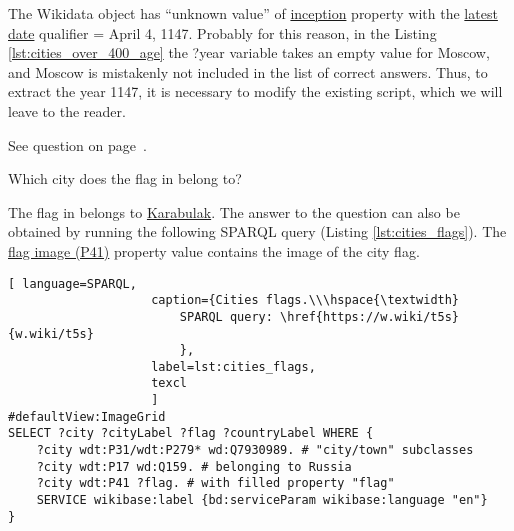 

The Wikidata object  has ``unknown value'' of \href{https://www.wikidata.org/wiki/Property:P571}{inception} property with the \href{https://www.wikidata.org/wiki/Property:P1326}{latest date} qualifier = April 4, 1147. Probably for this reason, in the Listing \ref{lst:cities_over_400_age} the ?year variable takes an empty value for Moscow, and Moscow is mistakenly not included in the list of correct answers. Thus, to extract the year 1147, it is necessary to modify the existing script, which we will leave to the reader.


See question on page~\pageref{question:cities_over_400_age}.

\begin{exercise}%
    \label{answer:cities_flags}
Which city does the flag in  belong to?
\end{exercise}

The flag in  belongs to \href{https://w.wiki/qqN}{Karabulak}. The answer to the question can also be obtained by running the following SPARQL query (Listing \ref{lst:cities_flags}). The \href{https://www.wikidata.org/wiki/Property:P41}{flag image (P41)} property value contains the image of the city flag.

\begin{lstlisting}[ language=SPARQL, 
                    caption={Cities flags.\\\hspace{\textwidth}
                        SPARQL query: \href{https://w.wiki/t5s}{w.wiki/t5s}
                        },
                    label=lst:cities_flags,
                    texcl 
                    ]
#defaultView:ImageGrid
SELECT ?city ?cityLabel ?flag ?countryLabel WHERE {
	?city wdt:P31/wdt:P279* wd:Q7930989. # "city/town" subclasses
	?city wdt:P17 wd:Q159. # belonging to Russia
	?city wdt:P41 ?flag. # with filled property "flag"
	SERVICE wikibase:label {bd:serviceParam wikibase:language "en"}
}
\end{lstlisting}%

